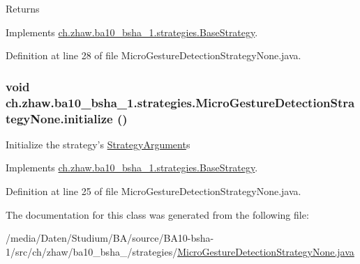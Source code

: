 \begin{DoxyReturn}{Returns}

\end{DoxyReturn}


Implements \hyperlink{classch_1_1zhaw_1_1ba10__bsha__1_1_1strategies_1_1BaseStrategy_aa0ebed55eed45409bad13d43a0058780}{ch.zhaw.ba10\_\-bsha\_\-1.strategies.BaseStrategy}.

Definition at line 28 of file MicroGestureDetectionStrategyNone.java.\hypertarget{classch_1_1zhaw_1_1ba10__bsha__1_1_1strategies_1_1MicroGestureDetectionStrategyNone_ab6f6f8d519b2fe7a8e3b3279145d5431}{
\subsubsection[{initialize}]{\setlength{\rightskip}{0pt plus 5cm}void ch.zhaw.ba10\_\-bsha\_\-1.strategies.MicroGestureDetectionStrategyNone.initialize ()}}
\label{classch_1_1zhaw_1_1ba10__bsha__1_1_1strategies_1_1MicroGestureDetectionStrategyNone_ab6f6f8d519b2fe7a8e3b3279145d5431}
Initialize the strategy's \hyperlink{classch_1_1zhaw_1_1ba10__bsha__1_1_1StrategyArgument}{StrategyArgument}s 

Implements \hyperlink{classch_1_1zhaw_1_1ba10__bsha__1_1_1strategies_1_1BaseStrategy_af6ea27835befac71906915236a347450}{ch.zhaw.ba10\_\-bsha\_\-1.strategies.BaseStrategy}.

Definition at line 25 of file MicroGestureDetectionStrategyNone.java.

The documentation for this class was generated from the following file:\begin{DoxyCompactItemize}
\item 
/media/Daten/Studium/BA/source/BA10-\/bsha-\/1/src/ch/zhaw/ba10\_\-bsha\_/strategies/\hyperlink{MicroGestureDetectionStrategyNone_8java}{MicroGestureDetectionStrategyNone.java}\end{DoxyCompactItemize}
